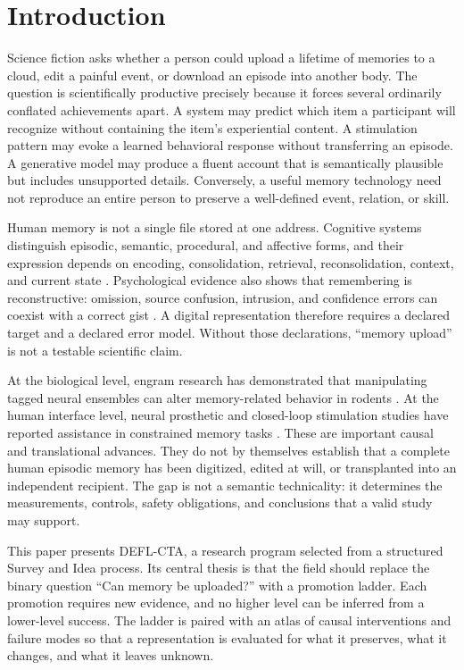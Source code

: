 \documentclass[conference]{IEEEtran}
\begin{document}
\section{Introduction}
Science fiction asks whether a person could upload a lifetime of memories to a cloud, edit a painful event, or download an episode into another body. The question is scientifically productive precisely because it forces several ordinarily conflated achievements apart. A system may predict which item a participant will recognize without containing the item's experiential content. A stimulation pattern may evoke a learned behavioral response without transferring an episode. A generative model may produce a fluent account that is semantically plausible but includes unsupported details. Conversely, a useful memory technology need not reproduce an entire person to preserve a well-defined event, relation, or skill.

Human memory is not a single file stored at one address. Cognitive systems distinguish episodic, semantic, procedural, and affective forms, and their expression depends on encoding, consolidation, retrieval, reconsolidation, context, and current state \cite{Squire2011,Kandel2014}. Psychological evidence also shows that remembering is reconstructive: omission, source confusion, intrusion, and confidence errors can coexist with a correct gist \cite{Schacter1999}. A digital representation therefore requires a declared target and a declared error model. Without those declarations, ``memory upload'' is not a testable scientific claim.

At the biological level, engram research has demonstrated that manipulating tagged neural ensembles can alter memory-related behavior in rodents \cite{Josselyn2020,Liu2012,Ramirez2013,Chen2019}. At the human interface level, neural prosthetic and closed-loop stimulation studies have reported assistance in constrained memory tasks \cite{Hampson2018,Ezzyat2018}. These are important causal and translational advances. They do not by themselves establish that a complete human episodic memory has been digitized, edited at will, or transplanted into an independent recipient. The gap is not a semantic technicality: it determines the measurements, controls, safety obligations, and conclusions that a valid study may support.

This paper presents DEFL-CTA, a research program selected from a structured Survey and Idea process. Its central thesis is that the field should replace the binary question ``Can memory be uploaded?'' with a promotion ladder. Each promotion requires new evidence, and no higher level can be inferred from a lower-level success. The ladder is paired with an atlas of causal interventions and failure modes so that a representation is evaluated for what it preserves, what it changes, and what it leaves unknown.
\end{document}
